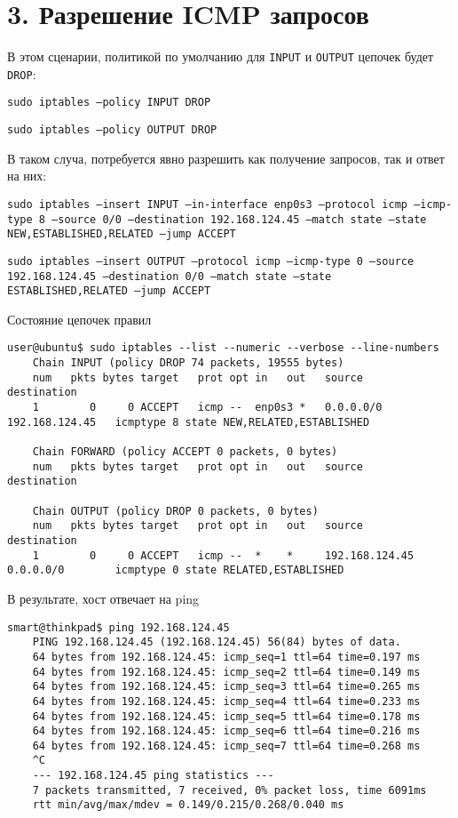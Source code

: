 \section*{3. Разрешение ICMP запросов}

В этом сценарии, политикой по умолчанию для \texttt{INPUT} и \texttt{OUTPUT} цепочек будет \texttt{DROP}:

\texttt{sudo iptables --policy INPUT DROP}

\texttt{sudo iptables --policy OUTPUT DROP}

В таком случа, потребуется явно разрешить как получение запросов, так и ответ на них:

\texttt{sudo iptables --insert INPUT --in-interface enp0s3 --protocol icmp --icmp-type 8 --source 0/0 --destination 192.168.124.45 --match state --state NEW,ESTABLISHED,RELATED --jump ACCEPT}

\texttt{sudo iptables --insert OUTPUT --protocol icmp --icmp-type 0 --source 192.168.124.45 --destination 0/0 --match state --state ESTABLISHED,RELATED --jump ACCEPT}

Состояние цепочек правил
\begin{Verbatim}[frame=single,breaklines=true,breakanywhere=true]
    user@ubuntu$ sudo iptables --list --numeric --verbose --line-numbers
    Chain INPUT (policy DROP 74 packets, 19555 bytes)
    num   pkts bytes target   prot opt in   out   source           destination
    1        0     0 ACCEPT   icmp --  enp0s3 *   0.0.0.0/0        192.168.124.45   icmptype 8 state NEW,RELATED,ESTABLISHED
    
    Chain FORWARD (policy ACCEPT 0 packets, 0 bytes)
    num   pkts bytes target   prot opt in   out   source           destination
    
    Chain OUTPUT (policy DROP 0 packets, 0 bytes)
    num   pkts bytes target   prot opt in   out   source           destination
    1        0     0 ACCEPT   icmp --  *    *     192.168.124.45   0.0.0.0/0        icmptype 0 state RELATED,ESTABLISHED
\end{Verbatim}

В результате, хост отвечает на ping
\begin{Verbatim}[frame=single,breaklines=true,breakanywhere=true]
    smart@thinkpad$ ping 192.168.124.45
    PING 192.168.124.45 (192.168.124.45) 56(84) bytes of data.
    64 bytes from 192.168.124.45: icmp_seq=1 ttl=64 time=0.197 ms
    64 bytes from 192.168.124.45: icmp_seq=2 ttl=64 time=0.149 ms
    64 bytes from 192.168.124.45: icmp_seq=3 ttl=64 time=0.265 ms
    64 bytes from 192.168.124.45: icmp_seq=4 ttl=64 time=0.233 ms
    64 bytes from 192.168.124.45: icmp_seq=5 ttl=64 time=0.178 ms
    64 bytes from 192.168.124.45: icmp_seq=6 ttl=64 time=0.216 ms
    64 bytes from 192.168.124.45: icmp_seq=7 ttl=64 time=0.268 ms
    ^C
    --- 192.168.124.45 ping statistics ---
    7 packets transmitted, 7 received, 0% packet loss, time 6091ms
    rtt min/avg/max/mdev = 0.149/0.215/0.268/0.040 ms
\end{Verbatim}

